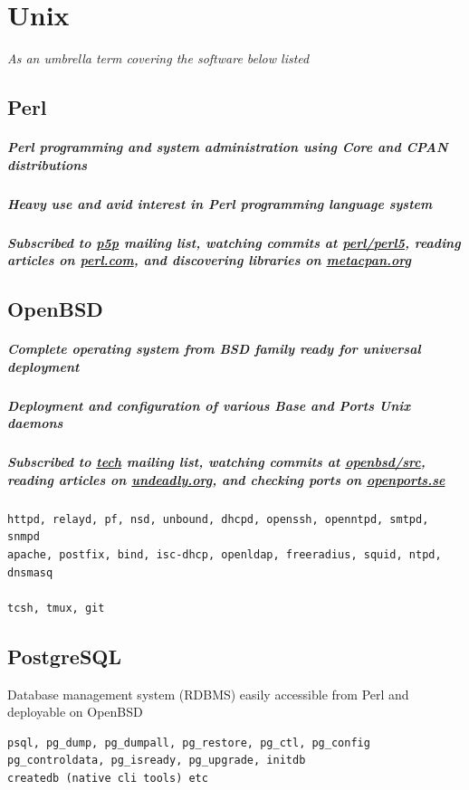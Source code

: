\documentclass {article}
\begin{document}
  \section{Unix} %
    \textit{As an umbrella term covering the software below listed}

    \subsection{Perl}
      \subparagraph{Perl programming and system administration using Core and CPAN distributions}
      \subparagraph{Heavy use and avid interest in Perl programming language system}
      \subparagraph{Subscribed to \href{https://lists.perl.org/list/perl5-porters.html}{p5p} mailing list, watching commits at \href{https://github.com/Perl/perl5}{perl/perl5}, reading articles on \href{https://perl.com/}{perl.com}, and discovering libraries on \href{https://metacpan.org/}{metacpan.org}}

    \subsection{OpenBSD}
      \subparagraph{Complete operating system from BSD family ready for universal deployment}
      \subparagraph{Deployment and configuration of various Base and Ports Unix daemons}
      \subparagraph{Subscribed to \href{https://www.openbsd.org/mail.html}{tech} mailing list, watching commits at \href{https://github.com/openbsd/src}{openbsd/src}, reading articles on \href{https://undeadly.org//}{undeadly.org}, and checking ports on \href{https://openports.se/}{openports.se}}
      \begin{verbatim}
httpd, relayd, pf, nsd, unbound, dhcpd, openssh, openntpd, smtpd, snmpd
apache, postfix, bind, isc-dhcp, openldap, freeradius, squid, ntpd, dnsmasq

tcsh, tmux, git
   \end{verbatim}

    \subsection{PostgreSQL}
      Database management system (RDBMS) easily accessible from Perl and deployable on OpenBSD
      \begin{verbatim}
psql, pg_dump, pg_dumpall, pg_restore, pg_ctl, pg_config
pg_controldata, pg_isready, pg_upgrade, initdb
createdb (native cli tools) etc
  \end{verbatim}
\end{document}

